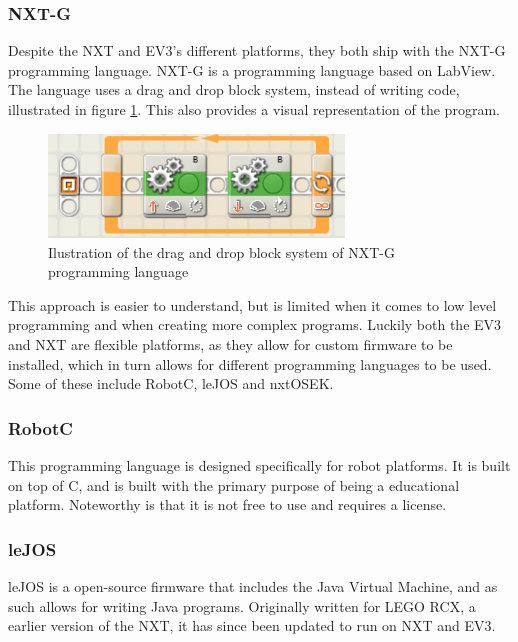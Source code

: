 \subsubsection{NXT-G}
Despite the NXT and EV3's different platforms, they both ship with the NXT-G programming language. NXT-G is a programming language based on LabView\cite{LabView}. The language uses a drag and drop block system, instead of writing code, illustrated in figure \ref{NXT-G}. This also provides a visual representation of the program.

\begin{figure}[H]
    \centering
    \includegraphics[width=0.7\textwidth]{Images/Software/Mindstorms/mindstorms_block.png}
    \caption{Ilustration of the drag and drop block system of NXT-G programming language}
    \label{NXT-G}
\end{figure}

This approach is easier to understand, but is limited when it comes to low level programming and when creating more complex programs. Luckily both the EV3 and NXT are flexible platforms, as they allow for custom firmware to be installed, which in turn allows for different programming languages to be used.
Some of these include RobotC\cite{RobotC}, leJOS\cite{leJOS} and nxtOSEK\cite{nxtOSEK}.

\subsubsection{RobotC}
This programming language is designed specifically for robot platforms. It is built on top of C, and is built with the primary purpose of being a educational platform. Noteworthy is that it is not free to use and requires a license.

\subsubsection{leJOS}
leJOS is a open-source firmware that includes the Java Virtual Machine\cite{Java}, and as such allows for writing Java programs. Originally written for LEGO RCX, a earlier version of the NXT, it has since been updated to run on NXT and EV3.


